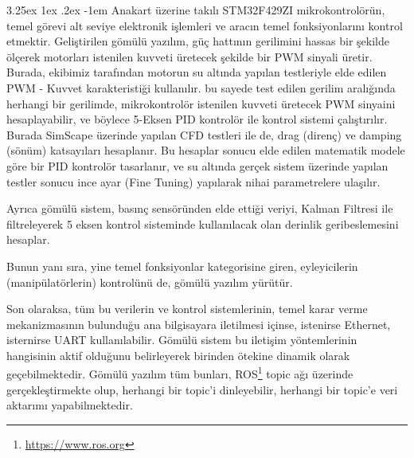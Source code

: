 \documentclass[12pt]{article}
\makeatletter
\newcounter{subsubsubsection}[subsubsection]
\renewcommand\paragraph{\@startsection{paragraph}{5}{\z@}%
  {3.25ex \@plus1ex \@minus.2ex}%
  {-1em}%
  {\normalfont\normalsize\bfseries}}
\makeatother
\begin{document}

 \paragraph{}  Anakart üzerine takılı STM32F429ZI mikrokontrolörün, temel görevi alt seviye elektronik işlemleri ve aracın temel fonksiyonlarını kontrol etmektir. Geliştirilen gömülü yazılım, güç hattının gerilimini hassas bir şekilde ölçerek motorları istenilen kuvveti üretecek şekilde bir PWM sinyali üretir. Burada, ekibimiz tarafından motorun su altında yapılan testleriyle elde edilen PWM - Kuvvet karakteristiği kullanılır. bu sayede test edilen gerilim aralığında herhangi bir gerilimde, mikrokontrolör istenilen kuvveti üretecek PWM sinyaini hesaplayabilir, ve böylece 5-Eksen PID kontrolör ile kontrol sistemi çalıştırılır. Burada SimScape üzerinde yapılan CFD testleri ile de, drag (direnç) ve damping (sönüm) katsayıları hesaplanır. Bu hesaplar sonucu elde edilen matematik modele göre bir PID kontrolör tasarlanır, ve su altında gerçek sistem üzerinde yapılan testler sonucu ince ayar (Fine Tuning) yapılarak nihai parametrelere ulaşılır. 

Ayrıca gömülü sistem, basınç sensöründen elde ettiği veriyi, Kalman Filtresi ile filtreleyerek 5 eksen kontrol sisteminde kullanılacak olan derinlik geribeslemesini hesaplar.



Bunun yanı sıra, yine temel fonksiyonlar kategorisine giren, eyleyicilerin (manipülatörlerin) kontrolünü de, gömülü yazılım yürütür.

Son olaraksa, tüm bu verilerin ve kontrol sistemlerinin, temel karar verme mekanizmasının bulunduğu ana bilgisayara iletilmesi içinse, istenirse Ethernet, isternirse UART kullanılabilir. Gömülü sistem bu iletişim yöntemlerinin hangisinin aktif olduğunu belirleyerek birinden ötekine dinamik olarak geçebilmektedir. Gömülü yazılım tüm bunları, ROS\footnote{\href{https://www.ros.org}{https://www.ros.org}} topic ağı üzerinde gerçekleştirmekte olup, herhangi bir topic'i dinleyebilir, herhangi bir topic'e veri aktarımı yapabilmektedir. 

\end{document}
